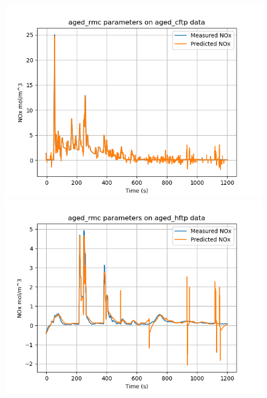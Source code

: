 \begin{figure}[H]
        \begin{minipage}{0.3\textwidth}
                \includegraphics[width = \textwidth]{./figs/figs_new_mdl/aged_rmc_aged_cftp.png}
        \end{minipage}
        \begin{minipage}{0.3\textwidth}
                \includegraphics[width = \textwidth]{./figs/figs_new_mdl/aged_rmc_aged_hftp.png}
        \end{minipage}
        \begin{minipage}{0.3\textwidth}

\end{minipage}
\end{figure}
